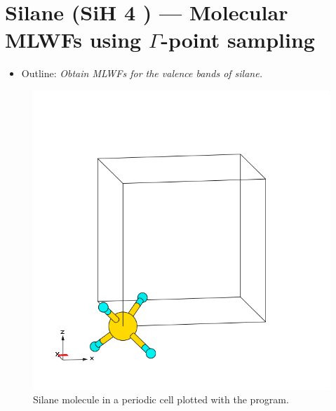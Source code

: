 \section{Silane (SiH 4 ) --- Molecular MLWFs using $\Gamma$-point sampling}
\label{sec7:silane}

\begin{itemize}
\item Outline: {\it Obtain MLWFs for the valence bands of silane.}
\end{itemize}

\begin{figure}[h!]
\centering
\includegraphics[width=0.25\columnwidth,trim={45pt 55pt 55pt 55pt},clip]{figure/example07/silane.png}
\caption{Silane molecule in a periodic cell plotted with the \xcrysden{} program.}
\label{fig7.0}
\end{figure}

